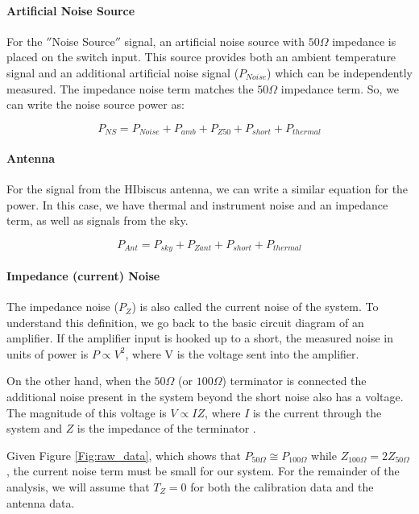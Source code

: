 \paragraph{Artificial Noise Source}
For the $''$Noise Source$''$ signal, an artificial noise source with $50 \Omega$ impedance is placed on the switch input. This source provides both an ambient temperature signal and an additional artificial noise signal ($P_{Noise}$) which can be independently measured. The impedance noise term matches the $50 \Omega$ impedance term. So, we can write the noise source power as:

\begin{equation}
P_{NS} = P_{Noise} + P_{amb}+P_{Z50}+P_{short} +P_{thermal}
\end{equation}


\paragraph{Antenna}
For the signal from the HIbiscus antenna, we can write a similar equation for the power. In this case, we have thermal and instrument noise and an impedance term, as well as signals from the sky. 

\begin{equation}\label{Eq:T_ant}
P_{Ant} = P_{sky}+P_{Zant}+P_{short} + P_{thermal}
\end{equation}

\paragraph{Impedance (current) Noise} 
The impedance noise ($P_Z$) is also called the current noise of the system. To understand this definition, we go back to the basic circuit diagram of an amplifier. If the amplifier input is hooked up to a short, the measured noise in units of power is $P \propto V^2$, where V is the voltage sent into the amplifier. 

On the other hand, when the $50 \Omega$ (or $100 \Omega$) terminator is connected the additional noise present in the system beyond the short noise also has a voltage. The magnitude of this voltage is $V\propto I Z$, where $I$ is the current through the system and $Z$ is the impedance of the terminator \cite{stutzman1981}.

Given Figure \ref{Fig:raw_data}, which shows that $P_{50 \Omega} \cong P_{100 \Omega}$ while $Z_{100 \Omega} = 2 Z_{50 \Omega}$, the current noise term must be small for our system. For the remainder of the analysis, we will assume that $T_Z = 0$ for both the calibration data and the antenna data. 

